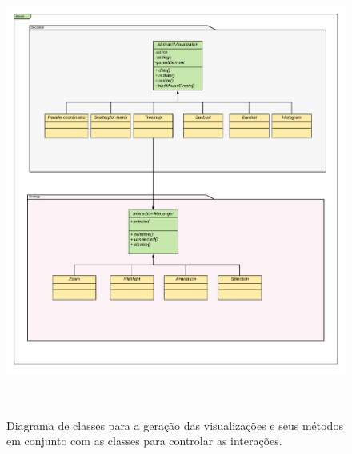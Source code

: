 \documentclass[
	12pt,				%
	openright,			%
	oneside,			%
	a4paper,			%
	english,			%
	brazil				%
	]{abntex2}
\begin{document}
\begin{figure}
	\caption{\label{classe_uml}Diagrama de classes para a geração das visualizações e seus métodos em conjunto com as classes para controlar as interações.}
	\begin{center}
	    \includegraphics[width=35pc,height=35pc]{figures/visApplication uml(1).pdf}
	\end{center}
\end{figure}
\end{document}
